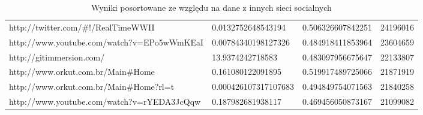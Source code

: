 \begin{sidewaystable}[h]
\begin{tabular}{ | p{14cm} | l | l | l| }
 http://twitter.com/\#!/RealTimeWWII                                                                                                                           &   0.0132752648543194 & 0.506326607842251 &  24196016 \\
 http://www.youtube.com/watch?v=EPo5wWmKEaI                                                                                                                   &  0.00784340198127326 & 0.484918411853964 &  23604659 \\
 http://gitimmersion.com/                                                                                                                                     &     13.9374242718583 & 0.483097956675647 &  22133807 \\
 http://www.orkut.com.br/Main\#Home                                                                                                                            &    0.161080122091895 & 0.519917489725066 &  21871919 \\
 http://www.orkut.com.br/Main\#Home?rl=t                                                                                                                       & 0.000426107317107683 & 0.494849754071563 &  21840258 \\
 http://www.youtube.com/watch?v=rYEDA3JcQqw                                                                                                                   &    0.187982681938117 & 0.469456050873167 &  21099082 \\
\hline
\end{tabular}
  \caption{Wyniki posortowane ze względu na dane z innych sieci socialnych }
  \label{tab:inne_wyniki_sorted}
\end{sidewaystable}



















